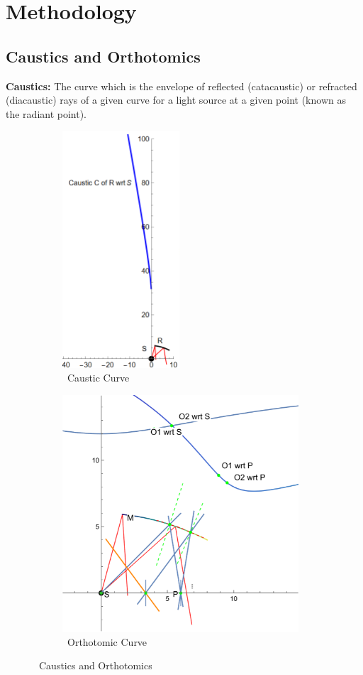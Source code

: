 \documentclass[12pt,a4paper,twoside]{report}
\begin{document}
\chapter{Methodology}
\section{Caustics and Orthotomics}
\justifying

\textbf{Caustics:}  The curve which is the envelope of reflected (catacaustic) or refracted (diacaustic) rays of a given curve for a light source at a given point (known as the radiant point). \cite{caustic}

\begin{figure}[h]
\begin{subfigure}[h]{0.4\textwidth}
	\centering
	\includegraphics[height=250pt]{caustic.png}
	\caption{~Caustic Curve}
\end{subfigure}
\begin{subfigure}[h]{0.5\textwidth}
	\centering
	\includegraphics[height=250pt]{ortho.png}
	\caption{~Orthotomic Curve}
\end{subfigure}
\caption{~Caustics and Orthotomics}

\end{figure}
\end{document}
